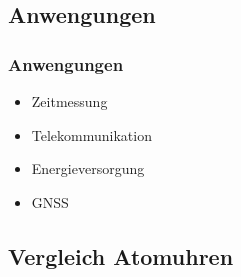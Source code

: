 

\newcommand{\CommonElementTextFormat}[4]
{
  \begin{minipage}{2.2cm}
    \centering
      {\textbf{#1} \hfill #2}%
      \linebreak \linebreak
      {\textbf{#3}}%
      \linebreak \linebreak
      {{#4}}
  \end{minipage}
}

\newcommand{\NaturalElementTextFormat}[4]
{
  \CommonElementTextFormat{#1}{#2}{\Huge {#3}}{#4}
}


\newcommand{\SyntheticElementTextFormat}[4]
{
  \CommonElementTextFormat{#1}{#2}{\Huge #3}{#4}
}

\subsection{Anwengungen}
\begin{frame}
  \frametitle{Anwengungen}

  \begin{itemize}
  \item Zeitmessung
  \item Telekommunikation
  \item Energieversorgung
  \item GNSS
  \end{itemize}
\end{frame}


\subsection{Vergleich Atomuhren}

